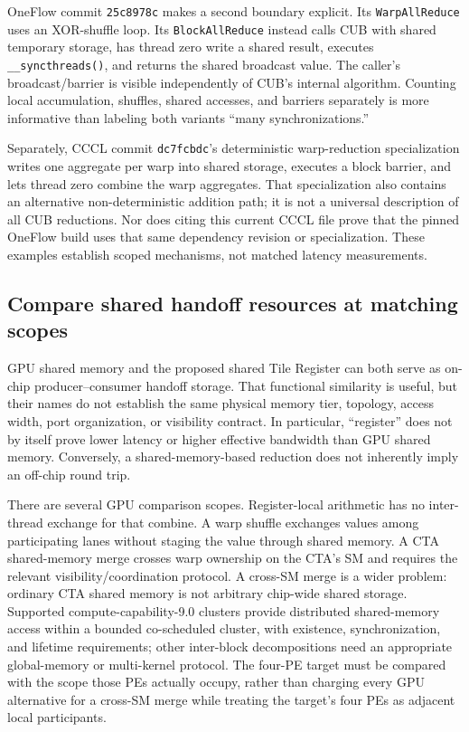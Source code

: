 OneFlow commit \texttt{25c8978c} makes a second boundary explicit. Its \texttt{WarpAllReduce} uses an XOR-shuffle loop. Its \texttt{BlockAllReduce} instead calls CUB with shared temporary storage, has thread zero write a shared result, executes \texttt{\_\_syncthreads()}, and returns the shared broadcast value. The caller's broadcast/barrier is visible independently of CUB's internal algorithm. Counting local accumulation, shuffles, shared accesses, and barriers separately is more informative than labeling both variants ``many synchronizations.''~\citep{u005-oneflow-softmax-pinned}

Separately, CCCL commit \texttt{dc7fcbdc}'s deterministic warp-reduction specialization writes one aggregate per warp into shared storage, executes a block barrier, and lets thread zero combine the warp aggregates. That specialization also contains an alternative non-deterministic addition path; it is not a universal description of all CUB reductions. Nor does citing this current CCCL file prove that the pinned OneFlow build uses that same dependency revision or specialization. These examples establish scoped mechanisms, not matched latency measurements.~\citep{u005-cub-warpreduce-pinned}

\subsection{Compare shared handoff resources at matching scopes}
\label{sec:u005-shared-scope}

GPU shared memory and the proposed shared Tile Register can both serve as on-chip producer--consumer handoff storage. That functional similarity is useful, but their names do not establish the same physical memory tier, topology, access width, port organization, or visibility contract. In particular, ``register'' does not by itself prove lower latency or higher effective bandwidth than GPU shared memory. Conversely, a shared-memory-based reduction does not inherently imply an off-chip round trip.

There are several GPU comparison scopes. Register-local arithmetic has no inter-thread exchange for that combine. A warp shuffle exchanges values among participating lanes without staging the value through shared memory. A CTA shared-memory merge crosses warp ownership on the CTA's SM and requires the relevant visibility/coordination protocol. A cross-SM merge is a wider problem: ordinary CTA shared memory is not arbitrary chip-wide shared storage. Supported compute-capability-9.0 clusters provide distributed shared-memory access within a bounded co-scheduled cluster, with existence, synchronization, and lifetime requirements; other inter-block decompositions need an appropriate global-memory or multi-kernel protocol. The four-PE target must be compared with the scope those PEs actually occupy, rather than charging every GPU alternative for a cross-SM merge while treating the target's four PEs as adjacent local participants.~\citep{u005-cuda-shared-scope}


